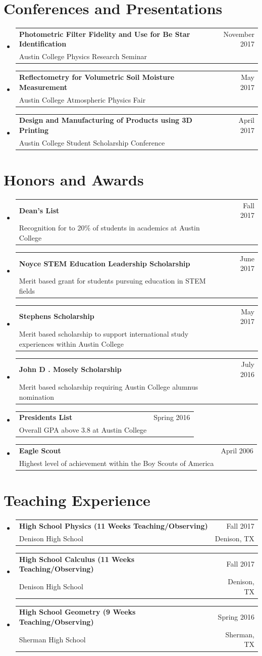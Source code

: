 \documentclass[letterpaper,11pt]{article}
\makeatletter
\newcommand{\CVSubheading}[4]{
  \vspace{-2pt}\item
    \begin{tabular*}{0.97\textwidth}[t]{l@{\extracolsep{\fill}}r}
      \textbf{#1} & #2 \\
      \small#3 & \small #4 \\
    \end{tabular*}\vspace{-7pt}
}
\newcommand{\CVSubHeadingListStart}{\begin{itemize}[leftmargin=0.5cm, label={}]}
\newcommand{\CVSubHeadingListEnd}{\end{itemize}}
\makeatother
\begin{document}
\section{Conferences and Presentations}
  \CVSubHeadingListStart
    \CVSubheading
      {Photometric Filter Fidelity and Use for Be Star Identification}{November 2017}
      {Austin College Physics Research Seminar}{}
    \CVSubheading
      {Reflectometry for Volumetric Soil Moisture Measurement}{May 2017}
      {Austin College Atmospheric Physics Fair}{}
    \CVSubheading
      {Design and Manufacturing of Products using 3D Printing}{April 2017}
      {Austin College Student Scholarship Conference}{}
  \CVSubHeadingListEnd

\section{Honors and Awards}
  \CVSubHeadingListStart
    \CVSubheading
      {Dean's List}{Fall 2017}
      {Recognition for to 20\% of students in academics at Austin College}{}
    \CVSubheading
      {Noyce STEM Education Leadership Scholarship}{June 2017}
      {Merit based grant for students pursuing education in STEM fields}{}
    \CVSubheading
      {Stephens Scholarship}{May 2017}
      {Merit based scholarship to support international study experiences within Austin College}{}
    \CVSubheading
      {John D . Mosely Scholarship}{July 2016}
      {Merit based scholarship requiring Austin College alumnus nomination}{}
    \CVSubheading
      {Presidents List}{Spring 2016}
      {Overall GPA above 3.8 at Austin College}{}
    \CVSubheading
      {Eagle Scout}{April 2006}
      {Highest level of achievement within the Boy Scouts of America}{}
  \CVSubHeadingListEnd

\section{Teaching Experience}
  \CVSubHeadingListStart
    \CVSubheading
      {High School Physics (11 Weeks Teaching/Observing)}{Fall 2017}
      {Denison High School}{Denison, TX}
    \CVSubheading
      {High School Calculus (11 Weeks Teaching/Observing)}{Fall 2017}
      {Denison High School}{Denison, TX}
    \CVSubheading
      {High School Geometry (9 Weeks Teaching/Observing)}{Spring 2016}
      {Sherman High School}{Sherman, TX}
  \CVSubHeadingListEnd
\fi
\end{document}

